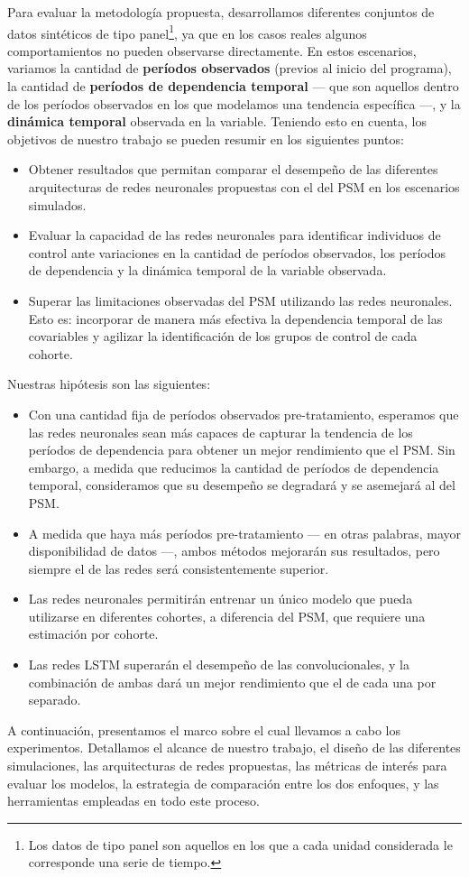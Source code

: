 \documentclass[../main.tex]{subfiles}
\begin{document}
Para evaluar la metodología propuesta, desarrollamos diferentes conjuntos de datos
sintéticos de tipo panel\footnote{Los datos de tipo panel son aquellos en los que a cada
unidad considerada le corresponde una serie de tiempo.}, ya que en los casos reales
algunos comportamientos no pueden observarse directamente. En estos escenarios, variamos
la cantidad de \textbf{períodos observados} (previos al inicio del programa), la cantidad
de \textbf{períodos de dependencia temporal} — que son aquellos dentro de los períodos
observados en los que modelamos una tendencia específica —, y la \textbf{dinámica
temporal} observada en la variable. Teniendo esto en cuenta, los objetivos de nuestro
trabajo se pueden resumir en los siguientes puntos:
\begin{itemize}
    \item Obtener resultados que permitan comparar el desempeño de las diferentes
    arquitecturas de redes neuronales propuestas con el del PSM en los escenarios
    simulados.
    \item Evaluar la capacidad de las redes neuronales para identificar individuos de
    control ante variaciones en la cantidad de períodos observados, los períodos de
    dependencia y la dinámica temporal de la variable observada.
    \item Superar las limitaciones observadas del PSM utilizando las redes neuronales.
    Esto es: incorporar de manera más efectiva la dependencia temporal de las covariables
    y agilizar la identificación de los grupos de control de cada cohorte.
\end{itemize}

Nuestras hipótesis son las siguientes:
\begin{itemize}
    \item Con una cantidad fija de períodos observados pre-tratamiento, esperamos que las
    redes neuronales sean más capaces de capturar la tendencia de los períodos de
    dependencia para obtener un mejor rendimiento que el PSM. Sin embargo, a medida que
    reducimos la cantidad de períodos de dependencia temporal, consideramos que su
    desempeño se degradará y se asemejará al del PSM.
    \item A medida que haya más períodos pre-tratamiento — en otras palabras, mayor
    disponibilidad de datos —, ambos métodos mejorarán sus resultados, pero siempre
    el de las redes será consistentemente superior.
    \item Las redes neuronales permitirán entrenar un único modelo que pueda utilizarse en
    diferentes cohortes, a diferencia del PSM, que requiere una estimación por cohorte.
    \item Las redes LSTM superarán el desempeño de las convolucionales, y la combinación de
    ambas dará un mejor rendimiento que el de cada una por separado.
\end{itemize}

A continuación, presentamos el marco sobre el cual llevamos a cabo los experimentos.
Detallamos el alcance de nuestro trabajo, el diseño de las diferentes simulaciones, las
arquitecturas de redes propuestas, las métricas de interés para evaluar los modelos, la
estrategia de comparación entre los dos enfoques, y las herramientas empleadas en todo
este proceso.
\end{document}
